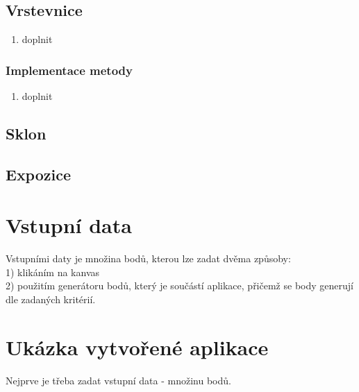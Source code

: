 \documentclass[a4paper, 12pt]{article}
\begin{document}
\clearpage

\subsection{Vrstevnice}

\begin{enumerate}
	\item doplnit
\end{enumerate}


\subsubsection{Implementace metody}
\begin{enumerate}
	\item doplnit
\end{enumerate}

\subsection{Sklon}

\subsection{Expozice}



\section{Vstupní data}

Vstupními daty je množina bodů, kterou lze zadat dvěma způsoby:\\
1) klikáním na kanvas\\
2) použitím generátoru bodů, který je součástí aplikace, přičemž se body generují dle zadaných kritérií.\\


\clearpage
\section{Ukázka vytvořené aplikace}


\clearpage


Nejprve je třeba zadat vstupní data - množinu bodů.\\
\end{document}
